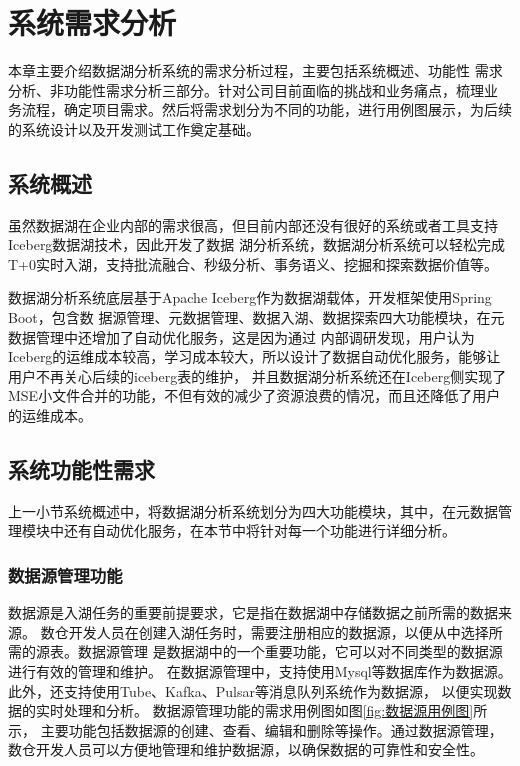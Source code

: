 
\chapter{系统需求分析}

本章主要介绍数据湖分析系统的需求分析过程，主要包括系统概述、功能性
需求分析、非功能性需求分析三部分。针对公司目前面临的挑战和业务痛点，梳理业
务流程，确定项目需求。然后将需求划分为不同的功能，进行用例图展示，为后续的系统设计以及开发测试工作奠定基础。

\section{系统概述}

虽然数据湖在企业内部的需求很高，但目前内部还没有很好的系统或者工具支持Iceberg数据湖技术，因此开发了数据
湖分析系统，数据湖分析系统可以轻松完成T+0实时入湖，支持批流融合、秒级分析、事务语义、挖掘和探索数据价值等。

数据湖分析系统底层基于Apache Iceberg作为数据湖载体，开发框架使用Spring Boot，包含数
据源管理、元数据管理、数据入湖、数据探索四大功能模块，在元数据管理中还增加了自动优化服务，这是因为通过
内部调研发现，用户认为Iceberg的运维成本较高，学习成本较大，所以设计了数据自动优化服务，能够让用户不再关心后续的iceberg表的维护，
并且数据湖分析系统还在Iceberg侧实现了MSE小文件合并的功能，不但有效的减少了资源浪费的情况，而且还降低了用户的运维成本。

\section{系统功能性需求}

上一小节系统概述中，将数据湖分析系统划分为四大功能模块，其中，在元数据管理模块中还有自动优化服务，在本节中将针对每一个功能进行详细分析。

\subsection{数据源管理功能}

数据源是入湖任务的重要前提要求，它是指在数据湖中存储数据之前所需的数据来源。
数仓开发人员在创建入湖任务时，需要注册相应的数据源，以便从中选择所需的源表。数据源管理
是数据湖中的一个重要功能，它可以对不同类型的数据源进行有效的管理和维护。
在数据源管理中，支持使用Mysql等数据库作为数据源。
此外，还支持使用Tube、Kafka、Pulsar等消息队列系统作为数据源，
以便实现数据的实时处理和分析。
数据源管理功能的需求用例图如图\ref{fig:数据源用例图}所示，
主要功能包括数据源的创建、查看、编辑和删除等操作。通过数据源管理，
数仓开发人员可以方便地管理和维护数据源，以确保数据的可靠性和安全性。

